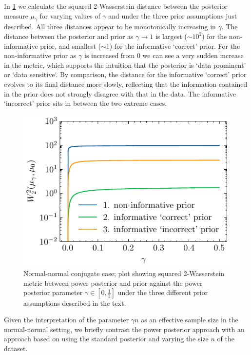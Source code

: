 \documentclass[12pt]{article}
\begin{document}
In \cref{fig:normal_normal_wasserstein_distance_different_priors} we calculate
the squared 2-Wasserstein distance between the posterior measure $\mu_\gamma$
for varying values of $\gamma$ and under the three prior assumptions just
described. All three distances appear to be monotonically increasing in
$\gamma$. The distance between the posterior and prior as $\gamma \to 1$ is
largest ($\sim10^2$) for the non-informative prior, and smallest ($\sim 1$) for
the informative `correct' prior. For the non-informative prior as $\gamma$ is
increased from $0$ we can see a very sudden increase in the metric, which
supports the intuition that the posterior is `data prominent' or `data
sensitive`. By comparison, the distance for the informative `correct' prior
evolves to its final distance more slowly, reflecting that the information
contained in the prior does not strongly disagree with that in the data. The
informative `incorrect' prior sits in between the two extreme cases.
\begin{figure}
\begin{center}
\includegraphics{imgs/normal_normal_wasserstein_distance_different_priors.pdf}
\end{center}
\caption{Normal-normal conjugate case; plot showing squared
2-Wasserstein metric between power posterior and prior against the
power posterior parameter $\gamma \in [0, \frac{1}{2}]$ under the three
different prior assumptions described in the text.}\label{fig:normal_normal_wasserstein_distance_different_priors}
\end{figure}

Given the interpretation of the parameter $\gamma n$ as an effective sample size
in the normal-normal setting, we briefly contrast the power posterior approach
with an approach based on using the standard posterior and varying the size $n$
of the dataset.
\end{document}

